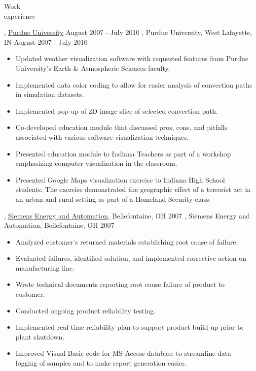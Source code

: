 \begin{category}{Work \\experience}
\begin{itemize}
\end{itemize}



\ifWebLinks
{}, \href{http://www.purdue.edu}{Purdue University}  August 2007 - July 2010 
\else
{}, Purdue University, West Lafayette, IN  August 2007 - July 2010 
\fi

\begin{itemize}
\item Updated weather visualization software with requested features from Purdue University's Earth \& Atmospheric Sciences faculty.
\item Implemented data color coding to allow for easier analysis of convection paths in simulation datasets.
\item Implemented pop-up of 2D image slice of selected convection path. %
\item Co-developed education module that discussed pros, cons, and pitfalls associated with various software visualization techniques.
\item Presented education module to Indiana Teachers as part of a workshop emphasizing computer visualization in the classroom.
\item Presented Google Maps visualization exercise to Indiana High School students. The exercise demonstrated the geographic effect of a terrorist act in an urban and rural setting as part of a Homeland Security class.
\end{itemize}
\ifWebLinks
{}, \href{http://www.energy.siemens.com/entry/energy/hq/en/}{Siemens Energy and Automation}, Bellefontaine, OH  2007 
\else
{}, Siemens Energy and Automation, Bellefontaine, OH  2007 
\fi

\begin{itemize}
\item Analyzed customer's returned materials establishing root cause of failure.
\item Evaluated failures, identified solution, and implemented corrective action on manufacturing line.
\item Wrote technical documents reporting root cause failure of product to customer.
\item Conducted ongoing product reliability testing.
\item Implemented real time reliability plan to support product build up prior to plant shutdown.
\item Improved Visual Basic code for MS Access database to streamline data logging of samples and to make report generation easier.
\end{itemize}


\end{category}
